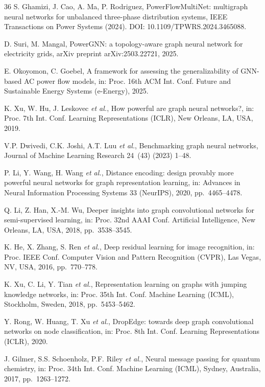 \documentclass[preprint,review,12pt]{elsarticle}
\begin{document}
\begin{thebibliography}{36}
 S. Ghamizi, J. Cao, A. Ma, P. Rodriguez, PowerFlowMultiNet: multigraph neural networks for unbalanced three-phase distribution systems, IEEE Transactions on Power Systems (2024). DOI: 10.1109/TPWRS.2024.3465088.

 D. Suri, M. Mangal, PowerGNN: a topology-aware graph neural network for electricity grids, arXiv preprint arXiv:2503.22721, 2025.

 E. Okoyomon, C. Goebel, A framework for assessing the generalizability of GNN-based AC power flow models, in: Proc. 16th ACM Int. Conf. Future and Sustainable Energy Systems (e-Energy), 2025.

 K. Xu, W. Hu, J. Leskovec \emph{et al.}, How powerful are graph neural networks?, in: Proc. 7th Int. Conf. Learning Representations (ICLR), New Orleans, LA, USA, 2019.

 V.P. Dwivedi, C.K. Joshi, A.T. Luu \emph{et al.}, Benchmarking graph neural networks, Journal of Machine Learning Research 24~(43) (2023) 1--48.

 P. Li, Y. Wang, H. Wang \emph{et al.}, Distance encoding: design provably more powerful neural networks for graph representation learning, in: Advances in Neural Information Processing Systems 33 (NeurIPS), 2020, pp.~4465--4478.

 Q. Li, Z. Han, X.-M. Wu, Deeper insights into graph convolutional networks for semi-supervised learning, in: Proc. 32nd AAAI Conf. Artificial Intelligence, New Orleans, LA, USA, 2018, pp.~3538--3545.

 K. He, X. Zhang, S. Ren \emph{et al.}, Deep residual learning for image recognition, in: Proc. IEEE Conf. Computer Vision and Pattern Recognition (CVPR), Las Vegas, NV, USA, 2016, pp.~770--778.

 K. Xu, C. Li, Y. Tian \emph{et al.}, Representation learning on graphs with jumping knowledge networks, in: Proc. 35th Int. Conf. Machine Learning (ICML), Stockholm, Sweden, 2018, pp.~5453--5462.

 Y. Rong, W. Huang, T. Xu \emph{et al.}, DropEdge: towards deep graph convolutional networks on node classification, in: Proc. 8th Int. Conf. Learning Representations (ICLR), 2020.

 J. Gilmer, S.S. Schoenholz, P.F. Riley \emph{et al.}, Neural message passing for quantum chemistry, in: Proc. 34th Int. Conf. Machine Learning (ICML), Sydney, Australia, 2017, pp.~1263--1272.


\end{thebibliography}
\end{document}
